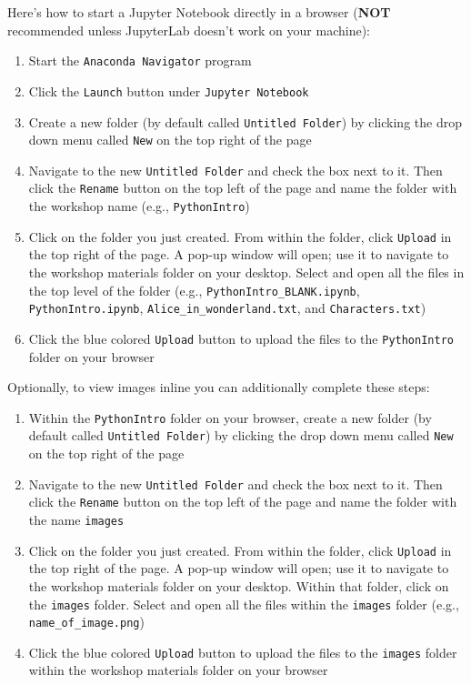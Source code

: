 \documentclass[]{book}
\providecommand{\tightlist}{%
  \setlength{\itemsep}{0pt}\setlength{\parskip}{0pt}}
\begin{document}
Here's how to start a Jupyter Notebook directly in a browser
(\textbf{NOT} recommended unless JupyterLab doesn't work on your
machine):

\begin{enumerate}
\def\labelenumi{\arabic{enumi}.}
\tightlist
\item
  Start the \texttt{Anaconda\ Navigator} program
\item
  Click the \texttt{Launch} button under \texttt{Jupyter\ Notebook}
\item
  Create a new folder (by default called \texttt{Untitled\ Folder}) by
  clicking the drop down menu called \texttt{New} on the top right of
  the page
\item
  Navigate to the new \texttt{Untitled\ Folder} and check the box next
  to it. Then click the \texttt{Rename} button on the top left of the
  page and name the folder with the workshop name (e.g.,
  \texttt{PythonIntro})
\item
  Click on the folder you just created. From within the folder, click
  \texttt{Upload} in the top right of the page. A pop-up window will
  open; use it to navigate to the workshop materials folder on your
  desktop. Select and open all the files in the top level of the folder
  (e.g., \texttt{PythonIntro\_BLANK.ipynb}, \texttt{PythonIntro.ipynb},
  \texttt{Alice\_in\_wonderland.txt}, and \texttt{Characters.txt})
\item
  Click the blue colored \texttt{Upload} button to upload the files to
  the \texttt{PythonIntro} folder on your browser
\end{enumerate}

Optionally, to view images inline you can additionally complete these
steps:

\begin{enumerate}
\def\labelenumi{\arabic{enumi}.}
\setcounter{enumi}{6}
\tightlist
\item
  Within the \texttt{PythonIntro} folder on your browser, create a new
  folder (by default called \texttt{Untitled\ Folder}) by clicking the
  drop down menu called \texttt{New} on the top right of the page
\item
  Navigate to the new \texttt{Untitled\ Folder} and check the box next
  to it. Then click the \texttt{Rename} button on the top left of the
  page and name the folder with the name \texttt{images}
\item
  Click on the folder you just created. From within the folder, click
  \texttt{Upload} in the top right of the page. A pop-up window will
  open; use it to navigate to the workshop materials folder on your
  desktop. Within that folder, click on the \texttt{images} folder.
  Select and open all the files within the \texttt{images} folder (e.g.,
  \texttt{name\_of\_image.png})
\item
  Click the blue colored \texttt{Upload} button to upload the files to
  the \texttt{images} folder within the workshop materials folder on
  your browser
\end{enumerate}
\end{document}

